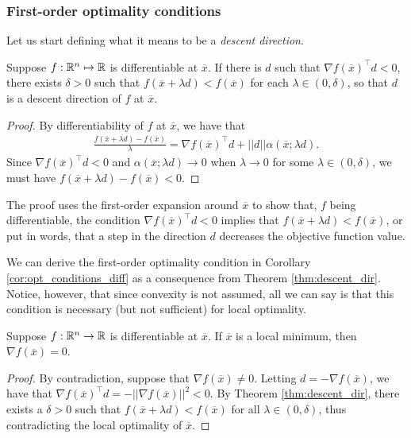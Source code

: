 \subsubsection{First-order optimality conditions}

Let us start defining what it means to be a \emph{descent direction}.

\begin{theorem}\label{thm:descent_dir}
Suppose $f: \mathbb{R}^n \mapsto \mathbb{R}$ is differentiable at $\overline{x}$. If there is $d$ such that $\nabla f(\overline{x})^\top d < 0$, there exists $\delta > 0$ such that $f(\overline{x} + \lambda d) < f(\overline{x})$ for each $\lambda \in (0, \delta)$, so that $d$ is a descent direction of $f$ at $\overline{x}$.
\end{theorem}
%
\begin{proof}
By differentiability of $f$ at $\overline{x}$, we have that 
\begin{align*}
\frac{f(\overline{x} + \lambda d)-f(\overline{x})}{\lambda} = \nabla f(\overline{x})^\top d + ||d||\alpha(\overline{x};\lambda d).
\end{align*}
Since $\nabla f(\overline{x})^\top d < 0$ and $\alpha(\overline{x};\lambda d) \rightarrow 0$ when $\lambda \rightarrow 0$ for some $\lambda \in (0, \delta)$, we must have $f(\overline{x} + \lambda d)-f(\overline{x}) < 0$.
\end{proof}

The proof uses the first-order expansion around $\overline{x}$ to show that, $f$ being differentiable, the condition $\nabla f(\overline{x})^\top d < 0$ implies that $ f(\overline{x} + \lambda d) < f(\overline{x})$, or put in words, that a step in the direction $d$ decreases the objective function value.

We can derive the first-order optimality condition in Corollary \ref{cor:opt_conditions_diff} as a consequence from Theorem \ref{thm:descent_dir}. Notice, however, that since convexity is not assumed, all we can say is that this condition is necessary (but not sufficient) for local optimality.

\begin{corollary}\label{thm:suff_first_order_cond}
Suppose $f: \mathbb{R}^n \rightarrow \mathbb{R}$ is differentiable at $\overline{x}$. If $\overline{x}$ is a local minimum, then $\nabla f(\overline{x}) = 0$.
\end{corollary}
%
\begin{proof}
By contradiction, suppose that $\nabla f(\overline{x}) \neq 0$. Letting $d = -\nabla f(\overline{x})$, we have that  $\nabla f(\overline{x})^\top d = -||\nabla f(\overline{x})||^2 < 0$. By Theorem \ref{thm:descent_dir}, there exists a $\delta > 0$ such that $f(\overline{x} + \lambda d) < f(\overline{x})$ for all $\lambda \in (0, \delta)$, thus contradicting the local optimality of $\overline{x}$. 
\end{proof}

